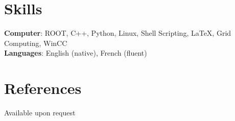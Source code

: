 \documentclass[margin,line]{res}
\begin{document}
\begin{resume}
\section{\sc Skills}
{\bf Computer}: ROOT, C++, Python, Linux, Shell Scripting, \LaTeX, Grid Computing, WinCC \\
{\bf Languages}: English (native), French (fluent)

\vspace{10pt} 
\section{\sc References}
Available upon request





\end{resume}
\end{document}
